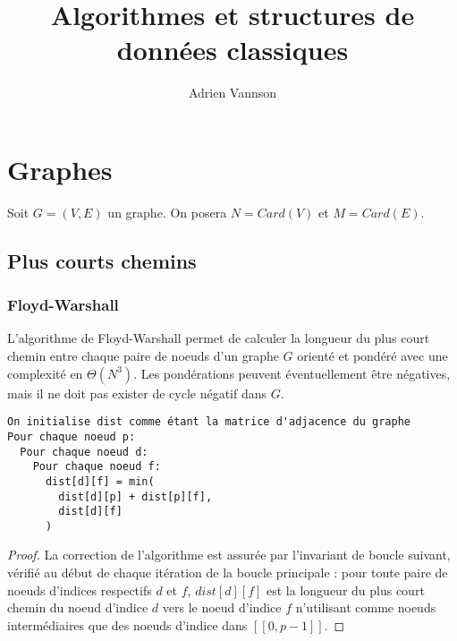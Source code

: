 \documentclass[11pt,a4paper]{article}
\title{Algorithmes et structures de données classiques}
\author{Adrien Vannson}
\date{}
\begin{document}
\maketitle
\tableofcontents

\newpage

\section{Graphes}
Soit \(G=(V,E)\) un graphe. On posera \(N = Card(V)\) et \(M=Card(E)\).

  \subsection{Plus courts chemins}

    \subsubsection{Floyd-Warshall}

L'algorithme de Floyd-Warshall permet de calculer la longueur du plus court chemin entre chaque paire de noeuds d'un graphe \(G\) orienté et pondéré avec une complexité en \(\Theta(N^3)\). Les pondérations peuvent éventuellement être négatives, mais il ne doit pas exister de cycle négatif dans \(G\).

\begin{verbatim}
On initialise dist comme étant la matrice d'adjacence du graphe
Pour chaque noeud p:
  Pour chaque noeud d:
    Pour chaque noeud f:
      dist[d][f] = min(
        dist[d][p] + dist[p][f],
        dist[d][f]
      )
\end{verbatim}

\begin{proof}
La correction de l'algorithme est assurée par l'invariant de boucle suivant, vérifié au début de chaque itération de la boucle principale : pour toute paire de noeuds d'indices respectifs \(d\) et \(f\), \(dist[d][f]\) est la longueur du plus court chemin du noeud d'indice \(d\) vers le noeud d'indice \(f\) n'utilisant comme noeuds intermédiaires que des noeuds d'indice dans \( [\![0, p-1]\!] \).
\end{proof}


\end{document}

